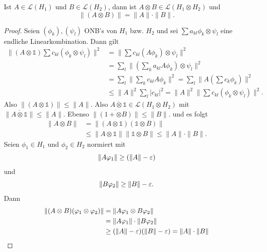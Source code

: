 \documentclass{mycourse}
\begin{document}
\begin{st}
Ist $A\in \mathcal L(H_1)$ und $B\in \mathcal L(H_2)$, dann ist $A\otimes B\in \mathcal L (H_1 \otimes H_2)$ und 
\[
\|(A\otimes B) \| = \| A \| \cdot \| B\|.
\]
\end{st}
\begin{proof}
Seien $(\phi_k), (\psi_l)$ ONB's von $H_1$ bzw. $H_2$ und sei $\sum a_{kl} \phi_k \otimes \psi_l$ eine endliche Linearkombination. Dann gilt
\begin{align*}
\|(A\otimes \mathbb 1) \sum c_{kl} (\phi_k \otimes \psi_l)\|^2 &= \|\sum c_{kl} (A\phi_k) \otimes \psi_l\|^2\\
&= \sum_l \| ( \sum_k a_{kl} A \phi_k) \otimes \psi_l\|^2 \\
&= \sum_l \| \sum_k c_{kl} A\phi_k\|^2 = \sum_l \| A(\sum c_k \phi_k)\|^2\\
&\le \|A\|^2 \sum_l |c_{kl}|^2 =\|A\|^2 \| \sum c_{kl} (\phi_k \otimes \psi_l)\|^2.
\end{align*}
Also $\|(A\otimes \mathbb 1)\|\le \|A\|$. Also $\overline{A\otimes \mathbb 1}\in \mathcal L(H_1 \otimes H_2)$ mit $\|\overline{A\otimes \mathbb 1}\|\le \|A\|$. Ebenso $\| \overline{(1+\otimes B)}\|\le \|B\|$.
und es folgt
\begin{align*}
\| A\otimes B\| &= \|(A\otimes \mathbb 1) (\mathbb 1\otimes B) \|\\
&\le \|A\otimes \mathbb 1 \| \|\mathbb 1\otimes B\| \le \|A\| \cdot \|B\|.
\end{align*}
Seien $\phi_1 \in H_1$ und $\phi_2 \in H_2$ normiert mit 
\[
\|A\varphi_1 \| \ge (\|A\|-\varepsilon)
\]
und 
\[
\|B\varphi_2\| \ge \| B\| - \varepsilon.
\]
Dann
\begin{align*}
\|(A\otimes B) (\varphi_1 \otimes \varphi_2) \| &= \| A \varphi_1 \otimes B \varphi_2\|\\
&= \| A\varphi_1\| \cdot \| B \varphi_2\| \\
&\ge ( \| A \| - \varepsilon) (\| B\| - \varepsilon) = \| A \| \cdot \|B\| 
\end{align*}
\fixme
\end{proof}
\end{document}
